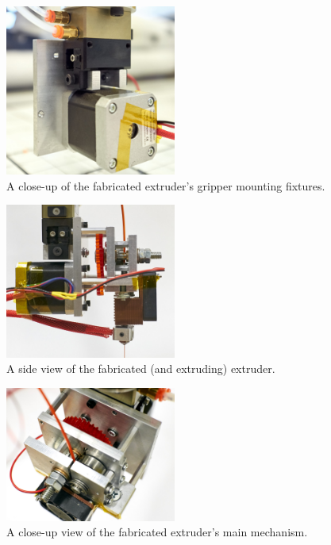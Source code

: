 \begin{figure}[h!]
\centering
\includegraphics[width=0.5\textwidth]{./figures/extruder-mounting}
\caption{A close-up of the fabricated extruder's gripper mounting fixtures.}
\label{fig:extruder-mounting}
\end{figure}

\begin{figure}[h!]
\centering
\includegraphics[width=0.5\textwidth]{./figures/extruder-side-profile}
\caption{A side view of the fabricated (and extruding) extruder.}
\label{fig:extruder-side-profile}
\end{figure}

\begin{figure}[h!]
\centering
\includegraphics[width=0.5\textwidth]{./figures/extruder-mechanism}
\caption{A close-up view of the fabricated extruder's main mechanism.}
\label{fig:extruder-mechanism}
\end{figure}


